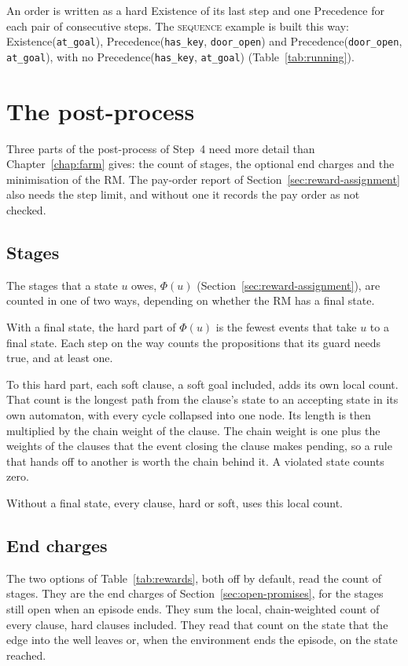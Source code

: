 \documentclass[11pt,english,listoffigures,listoftables]{tfgetsinf}
\newcommand{\runex}[1]{\textsc{#1}}  %
\begin{document}
An order is written as a hard Existence of its last step and one Precedence for each pair of consecutive steps. The \runex{sequence} example is built this way: Existence(\texttt{at\_goal}), Precedence(\texttt{has\_key}, \texttt{door\_open}) and Precedence(\texttt{door\_open}, \texttt{at\_goal}), with no \mbox{Precedence}(\texttt{has\_key}, \texttt{at\_goal}) (Table~\ref{tab:running}).

\section{The post-process}
Three parts of the post-process of Step~4 need more detail than Chapter~\ref{chap:farm} gives: the count of stages, the optional end charges and the minimisation of the RM. The pay-order report of Section~\ref{sec:reward-assignment} also needs the step limit, and without one it records the pay order as not checked.

\subsection{Stages}
The stages that a state $u$ owes, $\Phi(u)$ (Section~\ref{sec:reward-assignment}), are counted in one of two ways, depending on whether the RM has a final state.

With a final state, the hard part of $\Phi(u)$ is the fewest events that take $u$ to a final state. Each step on the way counts the propositions that its guard needs true, and at least one.

To this hard part, each soft clause, a soft goal included, adds its own local count. That count is the longest path from the clause's state to an accepting state in its own automaton, with every cycle collapsed into one node. Its length is then multiplied by the chain weight of the clause. The chain weight is one plus the weights of the clauses that the event closing the clause makes pending, so a rule that hands off to another is worth the chain behind it. A violated state counts zero.

Without a final state, every clause, hard or soft, uses this local count.

\subsection{End charges}
The two options of Table~\ref{tab:rewards}, both off by default, read the count of stages. They are the end charges of Section~\ref{sec:open-promises}, for the stages still open when an episode ends. They sum the local, chain-weighted count of every clause, hard clauses included. They read that count on the state that the edge into the well leaves or, when the environment ends the episode, on the state reached.
\end{document}
